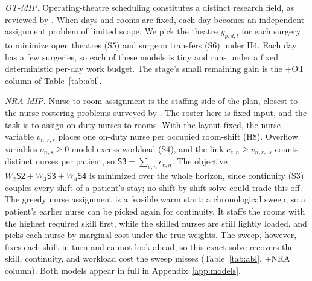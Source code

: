 \documentclass[11pt]{article}
\newcommand{\Sc}[1]{\textsf{S#1}}
\newcommand{\Hc}[1]{\textsf{H#1}}
\begin{document}
	\emph{OT-MIP.} Operating-theatre scheduling constitutes a distinct research field, as reviewed by \citet{cardoen2010}. When days and rooms are fixed, each day becomes an independent assignment problem of limited scope. We pick the theatre $y_{p,d,t}$ for each surgery to minimize open theatres (\Sc5) and surgeon transfers (\Sc6) under \Hc4. Each day has a few surgeries, so each of these models is tiny and runs under a fixed deterministic per-day work budget. The stage's small remaining gain is the +OT column of Table~\ref{tab:abl}.
	
	\emph{NRA-MIP.} Nurse-to-room assignment is the staffing side of the plan, closest to the nurse rostering problems surveyed by \citet{burke2004}. The roster here is fixed input, and the task is to assign on-duty nurses to rooms. With the layout fixed, the nurse variable $v_{n,r,s}$ places one on-duty nurse per
	occupied room-shift (\Hc8). Overflow variables $o_{n,s}\ge 0$ model excess workload (\Sc4), and the
	link $c_{e,n}\ge v_{n,r_e,s}$ counts distinct nurses per patient, so $\Sc3=\sum_{e,n}c_{e,n}$. The
	objective $W_2\Sc2+W_3\Sc3+W_4\Sc4$ is minimized over the whole horizon, since continuity (\Sc3) couples every shift of a patient's stay; no shift-by-shift solve could trade this off. The greedy nurse assignment is a feasible warm start: a chronological sweep, so a patient's earlier nurse can be picked again for continuity. It
	staffs the rooms with the highest required skill first, while the skilled nurses are still
	lightly loaded, and picks each nurse by marginal cost under the true weights. The sweep, however,
	fixes each shift in turn and cannot look ahead, so this exact solve recovers the skill,
	continuity, and workload cost the sweep misses (Table~\ref{tab:abl}, +NRA column). Both models appear in full in Appendix~\ref{app:models}.
\end{document}
